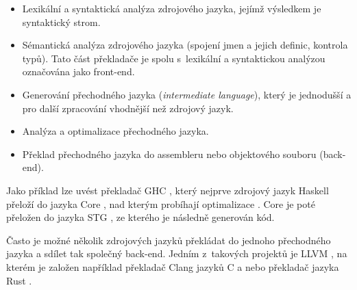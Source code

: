 \begin{itemize} 
  \item Lexikální a syntaktická analýza zdrojového jazyka, jejímž výsledkem je
    syntaktický strom.
  \item Sémantická analýza zdrojového jazyka (spojení jmen a jejich definic,
    kontrola typů). Tato část překladače je spolu s~lexikální a syntaktickou
    analýzou označována jako front-end.
  \item Generování přechodného jazyka (\emph{intermediate language}), který je
    jednodušší a pro další zpracování vhodnější než zdrojový jazyk.
  \item Analýza a optimalizace přechodného jazyka.
  \item Překlad přechodného jazyka do assembleru nebo objektového souboru
    (back-end).
\end{itemize}

Jako příklad lze uvést překladač GHC \cite{jones1993glasgow,haskellreport2010},
který nejprve zdrojový jazyk Haskell přeloží do jazyka Core
\cite{jones1996compiling}, nad kterým probíhají optimalizace
\cite{jones1997optimiser,santos1995compilation}. Core je poté přeložen do jazyka
STG \cite{jones1992implementing}, ze kterého je následně generován kód.

Často je možné několik zdrojových jazyků překládat do jednoho přechodného jazyka
a sdílet tak společný back-end. Jedním z~takových projektů je LLVM \cite{llvm},
na kterém je založen například překladač Clang \cite{clang} jazyků C a
\Cplusplus{} nebo překladač jazyka Rust \cite{rust}.
